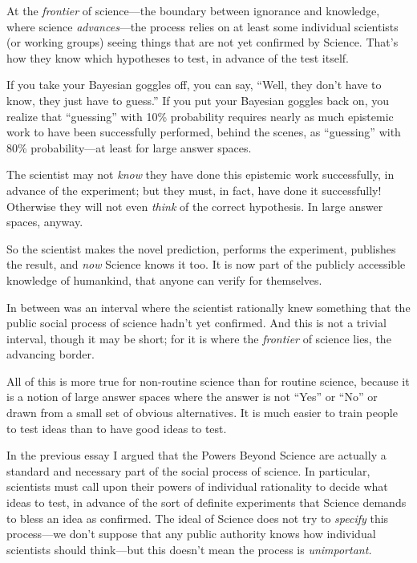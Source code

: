 {
 At the \textit{frontier} of science---the boundary between
ignorance and knowledge, where science \textit{advances}{}---the
process relies on at least some individual scientists (or working
groups) seeing things that are not yet confirmed by Science.
That's how they know which hypotheses to test, in
advance of the test itself.}

{
 If you take your Bayesian goggles off, you can say,
``Well, they don't have to know, they
just have to guess.'' If you put your Bayesian
goggles back on, you realize that
``guessing'' with 10\% probability
requires nearly as much epistemic work to have been successfully
performed, behind the scenes, as
``guessing'' with 80\%
probability---at least for large answer spaces.}

{
 The scientist may not \textit{know} they have done this epistemic
work successfully, in advance of the experiment; but they must, in
fact, have done it successfully! Otherwise they will not even
\textit{think} of the correct hypothesis. In large answer spaces,
anyway.}

{
 So the scientist makes the novel prediction, performs the
experiment, publishes the result, and \textit{now} Science knows it
too. It is now part of the publicly accessible knowledge of humankind,
that anyone can verify for themselves.}

{
 In between was an interval where the scientist rationally knew
something that the public social process of science
hadn't yet confirmed. And this is not a trivial
interval, though it may be short; for it is where the \textit{frontier}
of science lies, the advancing border.}

{
 All of this is more true for non-routine science than for routine
science, because it is a notion of large answer spaces where the answer
is not ``Yes'' or
``No'' or drawn from a small set of
obvious alternatives. It is much easier to train people to test ideas
than to have good ideas to test.}

\myendsectiontext


\bigskip


{
 In the previous essay I argued that the Powers Beyond Science are
actually a standard and necessary part of the social process of
science. In particular, scientists must call upon their powers of
individual rationality to decide what ideas to test, in advance of the
sort of definite experiments that Science demands to bless an idea as
confirmed. The ideal of Science does not try to \textit{specify} this
process---we don't suppose that any public authority
knows how individual scientists should think---but this
doesn't mean the process is \textit{unimportant.} }

